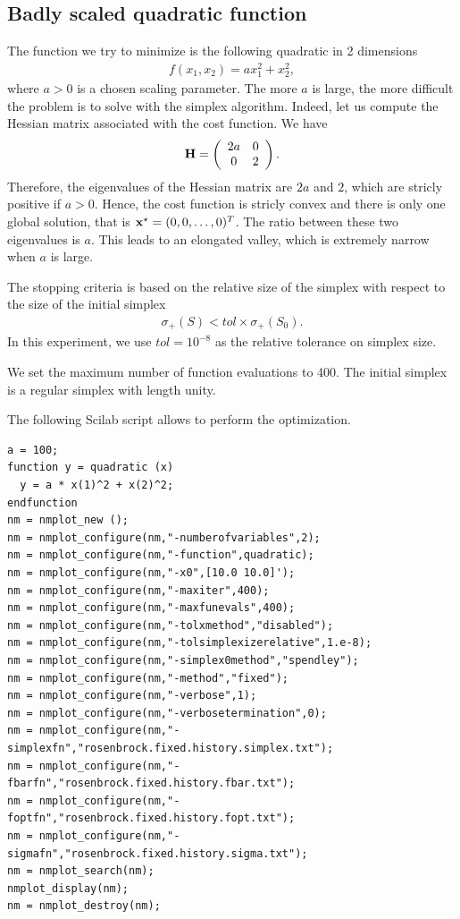 \subsection{Badly scaled quadratic function}

The function we try to minimize is the following quadratic 
in 2 dimensions 
\begin{eqnarray}
\label{quadratic-sp-function2}
f(x_1,x_2) = a x_1^2 + x_2^2,
\end{eqnarray}
where $a>0$ is a chosen scaling parameter. 
The more $a$ is large, the more difficult the problem is 
to solve with the simplex algorithm.
Indeed, let us compute the Hessian matrix associated with the 
cost function. We have 
\begin{eqnarray}
\mathbf{H} = \left(
\begin{array}{cc}
2 a & 0 \\
0 & 2
\end{array}
\right).
\end{eqnarray}
Therefore, the eigenvalues of the Hessian matrix 
are $2a$ and $2$, which are stricly 
positive if $a>0$. Hence, the cost function is stricly convex and 
there is only one global solution, that is $\mathbf{x}^\star = (0,0,\ldots,0)^T$.
The ratio between these two eigenvalues is $a$. This leads 
to an elongated valley, which is extremely narrow when $a$ is large.

The stopping criteria is based on the relative size of the simplex 
with respect to the size of the initial simplex 
\begin{eqnarray}
\sigma_+(S) < tol \times \sigma_+(S_0).
\end{eqnarray}
In this experiment, we use $tol=10^{-8}$ as the relative tolerance 
on simplex size.

We set the maximum number of function evaluations to 400.
The initial simplex is a regular simplex with length unity.

The following Scilab script allows to perform the optimization.

\lstset{language=scilabscript}
\begin{lstlisting}
a = 100;
function y = quadratic (x)
  y = a * x(1)^2 + x(2)^2;
endfunction
nm = nmplot_new ();
nm = nmplot_configure(nm,"-numberofvariables",2);
nm = nmplot_configure(nm,"-function",quadratic);
nm = nmplot_configure(nm,"-x0",[10.0 10.0]');
nm = nmplot_configure(nm,"-maxiter",400);
nm = nmplot_configure(nm,"-maxfunevals",400);
nm = nmplot_configure(nm,"-tolxmethod","disabled");
nm = nmplot_configure(nm,"-tolsimplexizerelative",1.e-8);
nm = nmplot_configure(nm,"-simplex0method","spendley");
nm = nmplot_configure(nm,"-method","fixed");
nm = nmplot_configure(nm,"-verbose",1);
nm = nmplot_configure(nm,"-verbosetermination",0);
nm = nmplot_configure(nm,"-simplexfn","rosenbrock.fixed.history.simplex.txt");
nm = nmplot_configure(nm,"-fbarfn","rosenbrock.fixed.history.fbar.txt");
nm = nmplot_configure(nm,"-foptfn","rosenbrock.fixed.history.fopt.txt");
nm = nmplot_configure(nm,"-sigmafn","rosenbrock.fixed.history.sigma.txt");
nm = nmplot_search(nm);
nmplot_display(nm);
nm = nmplot_destroy(nm);
\end{lstlisting}


